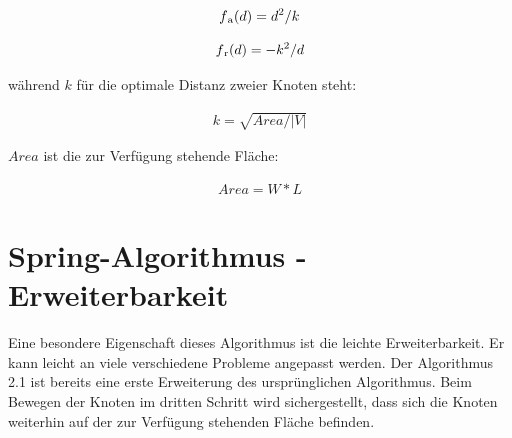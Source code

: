    
	\begin{align*}
		f\textsubscript a (d) =
			d^{2}/k
	\end{align*}
    
    \begin{align}
		f\textsubscript r (d) =
		-k^{2}/d
    \end{align}

während \begin{math} k \end{math} für die optimale Distanz zweier Knoten steht:

    \begin{align}
    	k =
    	\sqrt{Area / |V|}
    \end{align}

\begin{math} Area \end{math} ist die zur Verfügung stehende Fläche:

    \begin{align}
    Area =
    W * L
    \end{align}
  
\section{Spring-Algorithmus - Erweiterbarkeit}
\label{Kapitel_2_-_Unterkapitel_3}   
Eine besondere Eigenschaft dieses Algorithmus ist die leichte Erweiterbarkeit. Er kann leicht an viele verschiedene Probleme angepasst werden.
Der Algorithmus 2.1 ist bereits eine erste Erweiterung des ursprünglichen Algorithmus. Beim Bewegen der Knoten im dritten Schritt wird sichergestellt, dass sich die Knoten weiterhin auf der zur Verfügung stehenden Fläche befinden.


%
